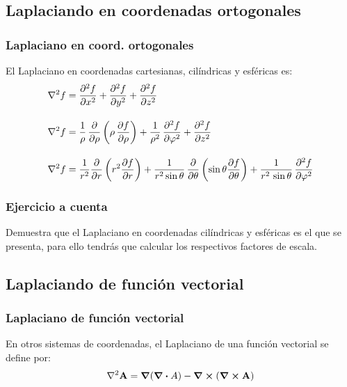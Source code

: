 \documentclass[12pt]{beamer}
\begin{document}
\subsection{Laplaciando en coordenadas ortogonales}
\begin{frame}
\frametitle{Laplaciano en coord. ortogonales}
El Laplaciano en coordenadas cartesianas, cilíndricas y esféricas es:
\fontsize{12}{12}\selectfont
\begin{align*}
\laplacian{f} &= \pdv[2]{f}{x} + \pdv[2]{f}{y} + \pdv[2]{f}{z} \\[1em]
\laplacian{f} &= \dfrac{1}{\rho} \, \pdv{\rho} \left( \rho \, \pdv{f}{\rho} \right) + \dfrac{1}{\rho^{2}} \, \pdv[2]{f}{\varphi} + \pdv[2]{f}{z} \\[1em]
\laplacian{f} &= \dfrac{1}{r^{2}} \pdv{r} \left( r^{2} \pdv{f}{r} \right) + \dfrac{1}{r^{2} \sin \theta} \, \pdv{\theta} \left( \sin \theta \pdv{f}{\theta} \right) + \dfrac{1}{r^{2} \, \sin \theta} \, \pdv[2]{f}{\varphi}
\end{align*}
\end{frame}
\begin{frame}
\frametitle{Ejercicio a cuenta}
Demuestra que el Laplaciano en coordenadas cilíndricas y esféricas es el que se presenta, para ello tendrás que calcular los respectivos factores de escala.
\end{frame}
\subsection*{Laplaciando de función vectorial}
\begin{frame}
\frametitle{Laplaciano de función vectorial}
En otros sistemas de coordenadas, el Laplaciano de una función vectorial se define por:
\begin{align*}
\laplacian{\vb{A}} = \grad{(\div{A})} - \curl{(\curl{\vb{A}})}
\end{align*}
\end{frame}
\end{document}
